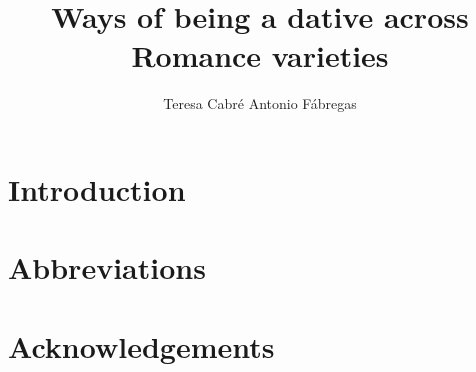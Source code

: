 \documentclass[output=paper,modfonts,nonflat]{langsci/langscibook}
\author{Teresa Cabré\affiliation{}\lastand
Antonio Fábregas\affiliation{}}
\title{Ways of being a dative across Romance varieties}
\begin{document}
\section{Introduction}  
 
\section*{Abbreviations}
\section*{Acknowledgements}

\sloppy
\printbibliography[heading=subbibliography,notkeyword=this] 
\end{document}
